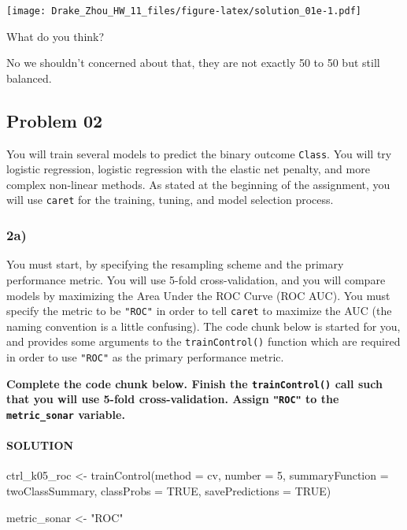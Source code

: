 \documentclass[
]{article}
\newenvironment{Shaded}{\begin{snugshade}}{\end{snugshade}}
\newcommand{\AttributeTok}[1]{\textcolor[rgb]{0.77,0.63,0.00}{#1}}
\newcommand{\ConstantTok}[1]{\textcolor[rgb]{0.00,0.00,0.00}{#1}}
\newcommand{\DecValTok}[1]{\textcolor[rgb]{0.00,0.00,0.81}{#1}}
\newcommand{\FunctionTok}[1]{\textcolor[rgb]{0.00,0.00,0.00}{#1}}
\newcommand{\NormalTok}[1]{#1}
\newcommand{\OtherTok}[1]{\textcolor[rgb]{0.56,0.35,0.01}{#1}}
\newcommand{\StringTok}[1]{\textcolor[rgb]{0.31,0.60,0.02}{#1}}
\begin{document}
\texttt{[image: Drake\_Zhou\_HW\_11\_files/figure-latex/solution\_01e-1.pdf]}

What do you think?

No we shouldn't concerned about that, they are not exactly 50 to 50 but
still balanced.

\hypertarget{problem-02}{%
\subsection{Problem 02}\label{problem-02}}

You will train several models to predict the binary outcome
\texttt{Class}. You will try logistic regression, logistic regression
with the elastic net penalty, and more complex non-linear methods. As
stated at the beginning of the assignment, you will use \texttt{caret}
for the training, tuning, and model selection process.

\hypertarget{a-1}{%
\subsubsection{2a)}\label{a-1}}

You must start, by specifying the resampling scheme and the primary
performance metric. You will use 5-fold cross-validation, and you will
compare models by maximizing the Area Under the ROC Curve (ROC AUC). You
must specify the metric to be \texttt{"ROC"} in order to tell
\texttt{caret} to maximize the AUC (the naming convention is a little
confusing). The code chunk below is started for you, and provides some
arguments to the \texttt{trainControl()} function which are required in
order to use \texttt{"ROC"} as the primary performance metric.

\textbf{Complete the code chunk below. Finish the
\texttt{trainControl()} call such that you will use 5-fold
cross-validation. Assign \texttt{"ROC"} to the \texttt{metric\_sonar}
variable.}

\hypertarget{solution-5}{%
\paragraph{SOLUTION}\label{solution-5}}

\begin{Shaded}
\begin{Highlighting}[]
\NormalTok{ctrl\_k05\_roc }\OtherTok{\textless{}{-}} \FunctionTok{trainControl}\NormalTok{(}\AttributeTok{method =} \StringTok{\textquotesingle{}cv\textquotesingle{}}\NormalTok{,}
                             \AttributeTok{number =} \DecValTok{5}\NormalTok{,}
                             \AttributeTok{summaryFunction =}\NormalTok{ twoClassSummary,}
                             \AttributeTok{classProbs =} \ConstantTok{TRUE}\NormalTok{,}
                             \AttributeTok{savePredictions =} \ConstantTok{TRUE}\NormalTok{)}

\NormalTok{metric\_sonar }\OtherTok{\textless{}{-}} \StringTok{"ROC"}
\end{Highlighting}
\end{Shaded}
\end{document}
